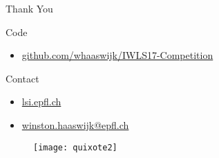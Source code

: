 \begin{frame}[t]{}
	\Huge Thank You
	\normalsize
	\begin{block}{Code}
		\begin{itemize}
			\item \href{https://github.com/whaaswijk/IWLS17-Competition}{github.com/whaaswijk/IWLS17-Competition}
		\end{itemize}
	\end{block}
	\begin{block}{Contact}
		\begin{itemize}
			\item \href{http://lsi.epfl.ch}{lsi.epfl.ch}
			\item \href{mailto:winston.haaswijk@epfl.ch}{winston.haaswijk@epfl.ch}
		\end{itemize}
	\end{block}
	\begin{figure}
		\centering
		\texttt{[image: quixote2]}
	\end{figure}
\end{frame}

